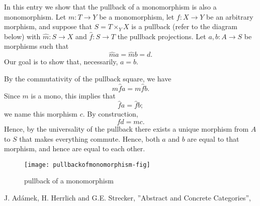 \documentclass[12pt]{article}
\begin{document}
In this entry we show that the pullback of a monomorphism is also a
monomorphism.  Let $m:T\to Y$ be a monomorphism, let $f:X\to Y$ be
an arbitrary morphism, and suppose that $S=T\times_Y X$ is a pullback
(refer to the diagram below) with $\hat{m}:S\to X$ and $\hat{f}:S\to
T$ the pullback projections.  Let $a,b:A\to S$ be morphisms such that
\[ \hat{m} a = \hat{m} b =d.\]
Our goal is to show that, necessarily, $a=b$.

By the commutativity of the pullback square, we have
\[ m \hat{f} a = m \hat{f} b.\]
Since $m$ is a mono, this implies that 
\[ \hat{f} a = \hat{f} b;\]
we name this morphism $c$.  By construction,
\[ fd = mc .\]
Hence, by the universality of the pullback there exists a unique
morphism from  $A$ to $S$ that makes everything commute.  Hence,
both $a$ and $b$ are equal to that morphism, and hence are equal to
each other.
\begin{figure}[h]
  \centering
  \medskip
  \texttt{[image: pullbackofmonomorphism-fig]}
  \medskip
  \caption{pullback of a monomorphism}
\end{figure}

\begin{thebibliography}{9}
 J. Ad\'amek, H. Herrlich and G.E. Strecker, ''Abstract and Concrete Categories'', 
\end{thebibliography}
\end{document}
